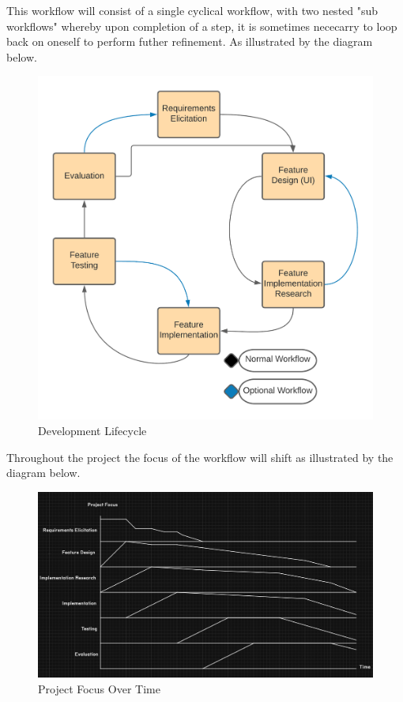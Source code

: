 This workflow will consist of a single cyclical workflow, with two nested "sub workflows" whereby upon completion of a step, it is sometimes nececarry to loop back on oneself to perform futher refinement. As illustrated by the diagram below.
\begin{figure}
  \begin{center}
    \includegraphics[scale=0.75]{Images/Project_Management_Methodology}
    \caption{Development Lifecycle}
    \label{fig:development lifecycle}
  \end{center}
\end{figure}
Throughout the project the focus of the workflow will shift as illustrated by the diagram below.

\begin{figure}
  \begin{center}
    \includegraphics[scale=0.4]{Images/ProjectFocus2}
    \caption{Project Focus Over Time}
    \label{fig:project focus}
  \end{center}
\end{figure}


